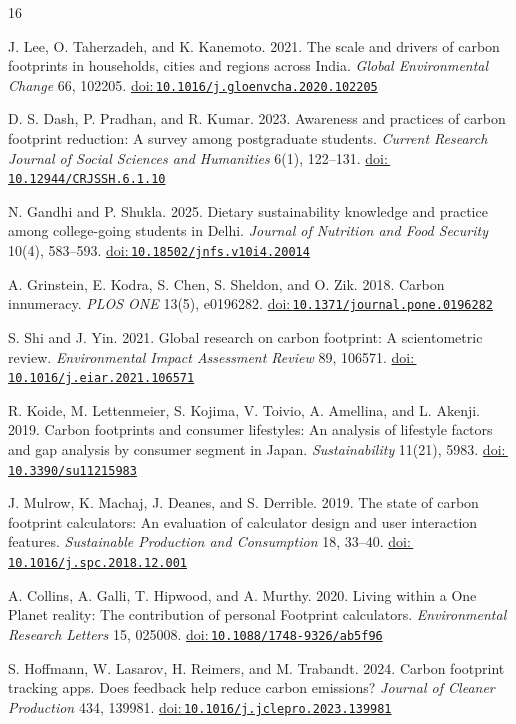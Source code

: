 \documentclass[10pt,a4paper,twocolumn]{article}
\newcommand{\doi}[1]{\href{https://doi.org/#1}{doi:\,\nolinkurl{#1}}}
\begin{document}
\begin{thebibliography}{16}
\scriptsize
\setlength{\itemsep}{0.5pt}

J. Lee, O. Taherzadeh, and K. Kanemoto. 2021. The scale and drivers of carbon footprints in households, cities and regions across India. \emph{Global Environmental Change} 66, 102205. \doi{10.1016/j.gloenvcha.2020.102205}

D. S. Dash, P. Pradhan, and R. Kumar. 2023. Awareness and practices of carbon footprint reduction: A survey among postgraduate students. \emph{Current Research Journal of Social Sciences and Humanities} 6(1), 122--131. \doi{10.12944/CRJSSH.6.1.10}

N. Gandhi and P. Shukla. 2025. Dietary sustainability knowledge and practice among college-going students in Delhi. \emph{Journal of Nutrition and Food Security} 10(4), 583--593. \doi{10.18502/jnfs.v10i4.20014}

A. Grinstein, E. Kodra, S. Chen, S. Sheldon, and O. Zik. 2018. Carbon innumeracy. \emph{PLOS ONE} 13(5), e0196282. \doi{10.1371/journal.pone.0196282}

S. Shi and J. Yin. 2021. Global research on carbon footprint: A scientometric review. \emph{Environmental Impact Assessment Review} 89, 106571. \doi{10.1016/j.eiar.2021.106571}

R. Koide, M. Lettenmeier, S. Kojima, V. Toivio, A. Amellina, and L. Akenji. 2019. Carbon footprints and consumer lifestyles: An analysis of lifestyle factors and gap analysis by consumer segment in Japan. \emph{Sustainability} 11(21), 5983. \doi{10.3390/su11215983}

J. Mulrow, K. Machaj, J. Deanes, and S. Derrible. 2019. The state of carbon footprint calculators: An evaluation of calculator design and user interaction features. \emph{Sustainable Production and Consumption} 18, 33--40. \doi{10.1016/j.spc.2018.12.001}

A. Collins, A. Galli, T. Hipwood, and A. Murthy. 2020. Living within a One Planet reality: The contribution of personal Footprint calculators. \emph{Environmental Research Letters} 15, 025008. \doi{10.1088/1748-9326/ab5f96}

S. Hoffmann, W. Lasarov, H. Reimers, and M. Trabandt. 2024. Carbon footprint tracking apps. Does feedback help reduce carbon emissions? \emph{Journal of Cleaner Production} 434, 139981. \doi{10.1016/j.jclepro.2023.139981}


\end{thebibliography}
\end{document}
